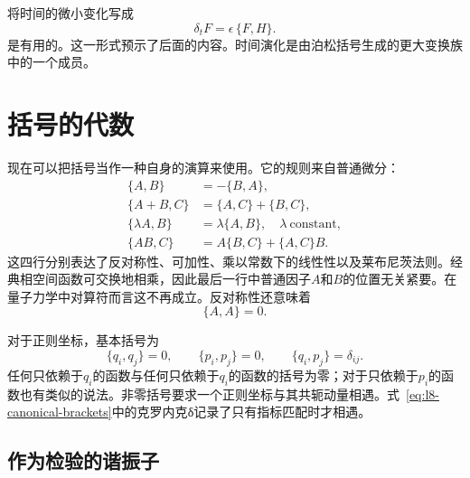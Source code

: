 \begin{classroomqa}
\end{classroomqa}

将时间的微小变化写成
\begin{equation}
  \delta_t F=\epsilon\,\{F,H\}.
  \label{eq:l8-small-time-step}
\end{equation}
是有用的。这一形式预示了后面的内容。时间演化是由泊松括号生成的更大变换族中的一个成员。

\section{括号的代数}

现在可以把括号当作一种自身的演算来使用。它的规则来自普通微分：
\begin{align}
  \{A,B\}&=-\{B,A\}, \label{eq:l8-antisymmetry}\\
  \{A+B,C\}&=\{A,C\}+\{B,C\}, \label{eq:l8-additivity}\\
  \{\lambda A,B\}&=\lambda\{A,B\},
    \quad \lambda\ \text{constant}, \label{eq:l8-scalar-rule}\\
  \{AB,C\}&=A\{B,C\}+\{A,C\}B. \label{eq:l8-leibniz}
\end{align}
这四行分别表达了反对称性、可加性、乘以常数下的线性性以及莱布尼茨法则。经典相空间函数可交换地相乘，因此最后一行中普通因子\(A\)和\(B\)的位置无关紧要。在量子力学中对算符而言这不再成立。反对称性还意味着
\begin{equation}
  \{A,A\}=0.
  \label{eq:l8-self-bracket}
\end{equation}

对于正则坐标，基本括号为
\begin{equation}
  \boxed{
  \{q_i,q_j\}=0,\qquad
  \{p_i,p_j\}=0,\qquad
  \{q_i,p_j\}=\delta_{ij}.}
  \label{eq:l8-canonical-brackets}
\end{equation}
任何只依赖于\(q_i\)的函数与任何只依赖于\(q_i\)的函数的括号为零；对于只依赖于\(p_i\)的函数也有类似的说法。非零括号要求一个正则坐标与其共轭动量相遇。式~\eqref{eq:l8-canonical-brackets}中的克罗内克{\proseunicodefont δ}记录了只有指标匹配时才相遇。

\subsection{作为检验的谐振子}


